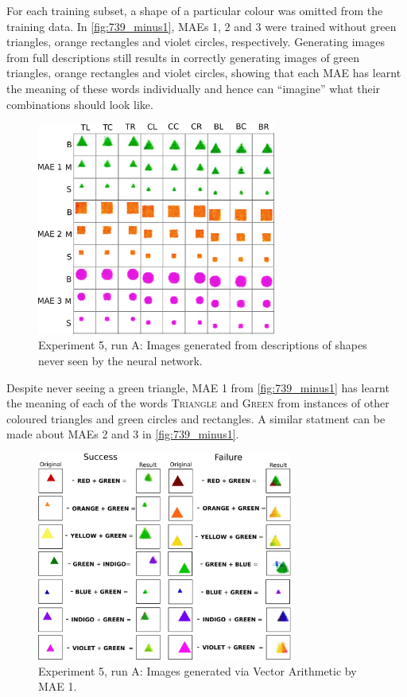 For each training subset, a shape of a particular colour was omitted from the training data. In \autoref{fig:739_minus1}, MAEs 1, 2 and 3 were trained without green triangles, orange rectangles and violet circles, respectively. Generating images from full descriptions still results in correctly generating images of green triangles, orange rectangles and violet circles, showing that each MAE has learnt the meaning of these words individually and hence can ``imagine'' what their combinations should look like. 

\begin{figure}[h]
\centering
\includegraphics[width=0.7\textwidth]{Figs/shapes/739_minus1.png}
\caption{Experiment 5, run A: Images generated from descriptions of shapes never seen by the neural network.}
\label{fig:739_minus1}
\end{figure}

Despite never seeing a green triangle, MAE 1 from \autoref{fig:739_minus1} has learnt the meaning of each of the words \textsc{Triangle} and \textsc{Green} from instances of other coloured triangles and green circles and rectangles. A similar statment can be made about MAEs 2 and 3 in \autoref{fig:739_minus1}.

\begin{figure}[h]
\centering
\includegraphics[width=0.75\textwidth]{Figs/shapes/739_minus1_vectorArthGT.png}
\caption{Experiment 5, run A: Images generated via Vector Arithmetic by MAE 1.}
\label{fig:739_vectorArth}
\end{figure}

